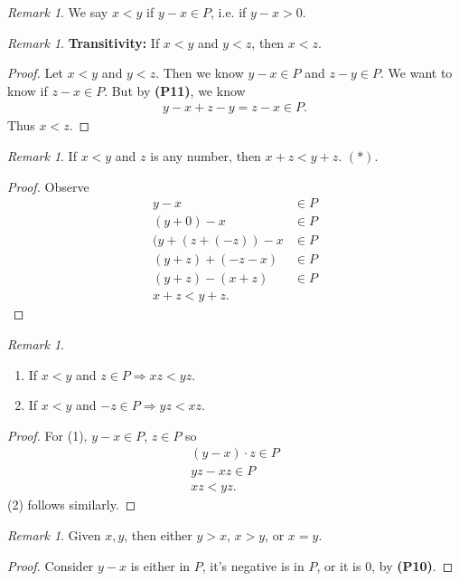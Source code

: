 \documentclass[12pt]{amsbook}
\theoremstyle{plain}
\numberwithin{section}{chapter}
\numberwithin{equation}{chapter}
\theoremstyle{definition}
\theoremstyle{remark}
\newtheorem{rem}[theorem]{Remark}
\theoremstyle{plain}
\newcommand{\bb}{\vspace{3mm}}
\newcommand{\bee}{\begin{equation}\begin{aligned}}
\newcommand{\eee}{\end{aligned}\end{equation}}
\begin{document}
\begin{rem}
We say $x < y$ if $y - x \in P$, i.e. if $y - x > 0$. 
\end{rem}

\begin{rem}
\textbf{Transitivity:} If $x < y$ and $y < z$, then $x < z$. 
\end{rem}
\begin{proof}
Let $x <y$ and $y < z$. Then we know $y - x \in P$ and $z - y \in P$. We want to know if $z - x \in P$. But by \textbf{(P11)}, we know 
\bee
y - x + z - y = z - x \in P.
\eee
Thus $x < z$. 
\end{proof}

\begin{rem}
If $x < y$ and $z$ is any number, then $x + z < y + z$. $(*)$. 
\end{rem}

\begin{proof}
Observe
\bee
y - x &\in P\\
(y + 0) - x &\in P\\
(y + (z + (-z)) -x &\in P\\
(y + z) + (-z -x) &\in P\\
(y + z) - (x + z) &\in P\\
x + z < y + z.
\eee
\end{proof}

\begin{rem}

\bb

\begin{enumerate}
\item If $x < y$ and $z \in P \Rightarrow xz < yz$. 
\item If $x < y$ and $-z \in P \Rightarrow yz < xz$. 
\end{enumerate}

\end{rem}
\begin{proof}
For (1), $y - x \in P$, $z \in P$ so 
\bee
(y - x)\cdot z \in P\\
yz - xz \in P\\
xz < yz.
\eee
(2) follows similarly. 
\end{proof}

\begin{rem}
Given $x,y$, then either $y > x$, $x > y$, or $x = y$. 
\end{rem}
\begin{proof}
Consider $y - x$ is either in $P$, it's negative is in $P$, or it is $0$, by \textbf{(P10)}. 
\end{proof}
\end{document}
